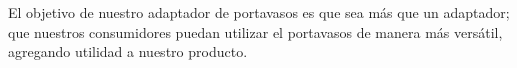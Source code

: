 \tab El objetivo de nuestro adaptador de portavasos es que sea más que un adaptador; que nuestros consumidores puedan utilizar el portavasos de manera más versátil, agregando utilidad a nuestro producto. 
